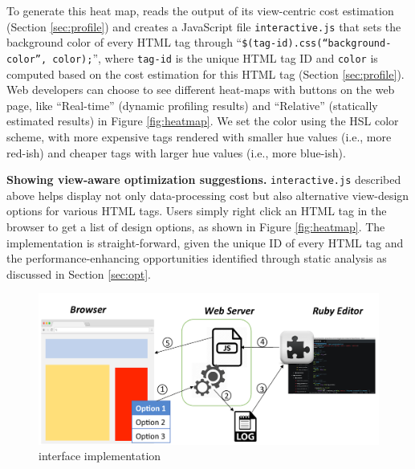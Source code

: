 To generate this heat map, \Tool reads the output of its 
view-centric cost estimation (Section \ref{sec:profile}) 
and creates a JavaScript file {\tt interactive.js} that 
sets the background color
of every HTML tag through
``{\tt \$(tag-id).css(``background-color'', color);}'', where {\tt tag-id} is the
unique HTML tag ID and {\tt color} is computed based on the cost estimation for this HTML tag (Section \ref{sec:profile}).
Web developers can choose to see different heat-maps with
buttons on the web page, like ``Real-time'' (dynamic profiling
results) and ``Relative'' (statically estimated results) 
in Figure \ref{fig:heatmap}. We set the color using the HSL color scheme, with
more expensive tags rendered with smaller hue values (i.e., more red-ish) and
cheaper tags with larger hue values (i.e., more blue-ish).

 


\textbf{Showing view-aware optimization suggestions.}
{\tt interactive.js} described above
helps display not only 
data-processing cost but
also alternative view-design options for various HTML tags. 
Users simply right click
an HTML tag in the browser to get a list of design options, as shown in Figure \ref{fig:heatmap}.
The implementation is straight-forward,
given the unique ID of every HTML tag and the performance-enhancing opportunities
identified through \Tool static analysis as discussed in Section \ref{sec:opt}.

\begin{figure}
    \centering
    \includegraphics[width=\columnwidth]{panorama-figs/interface.pdf}
    \caption{\Tool interface implementation}
    \label{fig:interaction}
     \vspace{-0.2in}
\end{figure}

